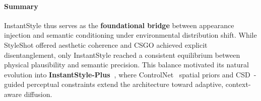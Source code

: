 \paragraph{Summary}
InstantStyle thus serves as the \textbf{foundational bridge} between appearance injection and semantic conditioning under environmental distribution shift.  
While StyleShot offered aesthetic coherence and CSGO achieved explicit disentanglement, only InstantStyle reached a consistent equilibrium between physical plausibility and semantic precision.  
This balance motivated its natural evolution into \textbf{InstantStyle-Plus~\cite{wang2024instantstyleplus}}, where ControlNet~\cite{zhang2023controlnet} spatial priors and CSD~\cite{somepalli2024csd}-guided perceptual constraints extend the architecture toward adaptive, context-aware diffusion.




